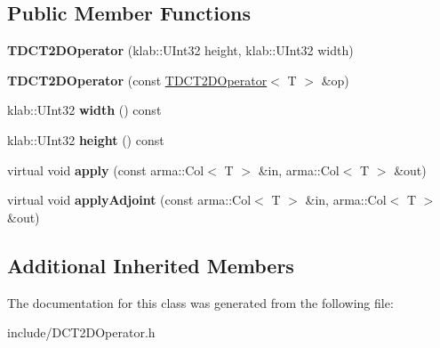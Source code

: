 \subsection*{Public Member Functions}
\begin{DoxyCompactItemize}
\item 
{\bfseries T\+D\+C\+T2\+D\+Operator} (klab\+::\+U\+Int32 height, klab\+::\+U\+Int32 width)\hypertarget{classkl1p_1_1TDCT2DOperator_a755c0490f848a9cbfac1dae82ae2df1e}{}\label{classkl1p_1_1TDCT2DOperator_a755c0490f848a9cbfac1dae82ae2df1e}

\item 
{\bfseries T\+D\+C\+T2\+D\+Operator} (const \hyperlink{classkl1p_1_1TDCT2DOperator}{T\+D\+C\+T2\+D\+Operator}$<$ T $>$ \&op)\hypertarget{classkl1p_1_1TDCT2DOperator_afc56e77b325b3b9dccc4372c2cd349e3}{}\label{classkl1p_1_1TDCT2DOperator_afc56e77b325b3b9dccc4372c2cd349e3}

\item 
klab\+::\+U\+Int32 {\bfseries width} () const \hypertarget{classkl1p_1_1TDCT2DOperator_ab92aa17505d7be75a6a7c804eb192afa}{}\label{classkl1p_1_1TDCT2DOperator_ab92aa17505d7be75a6a7c804eb192afa}

\item 
klab\+::\+U\+Int32 {\bfseries height} () const \hypertarget{classkl1p_1_1TDCT2DOperator_abf22d3b8de5df8cae3cb0ebcab325613}{}\label{classkl1p_1_1TDCT2DOperator_abf22d3b8de5df8cae3cb0ebcab325613}

\item 
virtual void {\bfseries apply} (const arma\+::\+Col$<$ T $>$ \&in, arma\+::\+Col$<$ T $>$ \&out)\hypertarget{classkl1p_1_1TDCT2DOperator_afdb84577219e4e08176b884bab33ab96}{}\label{classkl1p_1_1TDCT2DOperator_afdb84577219e4e08176b884bab33ab96}

\item 
virtual void {\bfseries apply\+Adjoint} (const arma\+::\+Col$<$ T $>$ \&in, arma\+::\+Col$<$ T $>$ \&out)\hypertarget{classkl1p_1_1TDCT2DOperator_ac61924f3137625ae883514383e5f532e}{}\label{classkl1p_1_1TDCT2DOperator_ac61924f3137625ae883514383e5f532e}

\end{DoxyCompactItemize}
\subsection*{Additional Inherited Members}


The documentation for this class was generated from the following file\+:\begin{DoxyCompactItemize}
\item 
include/D\+C\+T2\+D\+Operator.\+h\end{DoxyCompactItemize}
